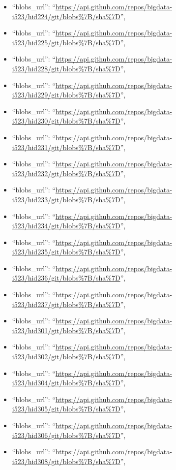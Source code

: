\begin{itemize}
\item
  ``blobs\_url'':
  ``\url{https://api.github.com/repos/bigdata-i523/hid224/git/blobs\%7B/sha\%7D}'',
\item
  ``blobs\_url'':
  ``\url{https://api.github.com/repos/bigdata-i523/hid225/git/blobs\%7B/sha\%7D}'',
\item
  ``blobs\_url'':
  ``\url{https://api.github.com/repos/bigdata-i523/hid228/git/blobs\%7B/sha\%7D}'',
\item
  ``blobs\_url'':
  ``\url{https://api.github.com/repos/bigdata-i523/hid229/git/blobs\%7B/sha\%7D}'',
\item
  ``blobs\_url'':
  ``\url{https://api.github.com/repos/bigdata-i523/hid230/git/blobs\%7B/sha\%7D}'',
\item
  ``blobs\_url'':
  ``\url{https://api.github.com/repos/bigdata-i523/hid231/git/blobs\%7B/sha\%7D}'',
\item
  ``blobs\_url'':
  ``\url{https://api.github.com/repos/bigdata-i523/hid232/git/blobs\%7B/sha\%7D}'',
\item
  ``blobs\_url'':
  ``\url{https://api.github.com/repos/bigdata-i523/hid233/git/blobs\%7B/sha\%7D}'',
\item
  ``blobs\_url'':
  ``\url{https://api.github.com/repos/bigdata-i523/hid234/git/blobs\%7B/sha\%7D}'',
\item
  ``blobs\_url'':
  ``\url{https://api.github.com/repos/bigdata-i523/hid235/git/blobs\%7B/sha\%7D}'',
\item
  ``blobs\_url'':
  ``\url{https://api.github.com/repos/bigdata-i523/hid236/git/blobs\%7B/sha\%7D}'',
\item
  ``blobs\_url'':
  ``\url{https://api.github.com/repos/bigdata-i523/hid237/git/blobs\%7B/sha\%7D}'',
\item
  ``blobs\_url'':
  ``\url{https://api.github.com/repos/bigdata-i523/hid301/git/blobs\%7B/sha\%7D}'',
\item
  ``blobs\_url'':
  ``\url{https://api.github.com/repos/bigdata-i523/hid302/git/blobs\%7B/sha\%7D}'',
\item
  ``blobs\_url'':
  ``\url{https://api.github.com/repos/bigdata-i523/hid304/git/blobs\%7B/sha\%7D}'',
\item
  ``blobs\_url'':
  ``\url{https://api.github.com/repos/bigdata-i523/hid305/git/blobs\%7B/sha\%7D}'',
\item
  ``blobs\_url'':
  ``\url{https://api.github.com/repos/bigdata-i523/hid306/git/blobs\%7B/sha\%7D}'',
\item
  ``blobs\_url'':
  ``\url{https://api.github.com/repos/bigdata-i523/hid308/git/blobs\%7B/sha\%7D}'',

\end{itemize}
